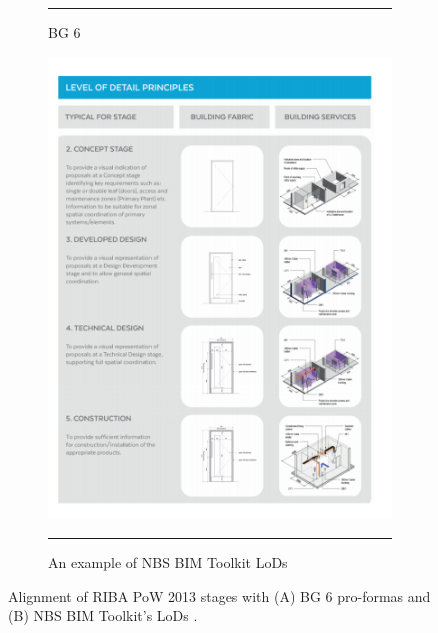 \begin{figure}[htbp]
\begin{subfigure}[b]{.25\textwidth}
		\rule{\textwidth}{0.5pt} %
		\caption{BG 6}
		\label{BG6_RIBAPoW_alignment}
	\end{subfigure}%
	\begin{subfigure}[b]{.75\textwidth}
		\centering
		\includegraphics[width=\textwidth]{figures/NBS_LoD_alignment.png}
		\rule{.93\textwidth}{0.5pt} %
		\caption{An example of NBS BIM Toolkit LoDs}
		\label{NBS_LoD_alignment}
	\end{subfigure}
	\caption[Alignment of work stages with BG 6 and NBS LODs.]{Alignment of RIBA PoW 2013 stages with ({\scriptsize A}) BG 6 pro-formas \citep[Table~1]{BG62014} and ({\scriptsize B}) NBS BIM Toolkit's LoDs \citep{NBS_LoD_Kell}.}
	\label{BG6_NBS_alignment_w_stages}
\end{figure}


